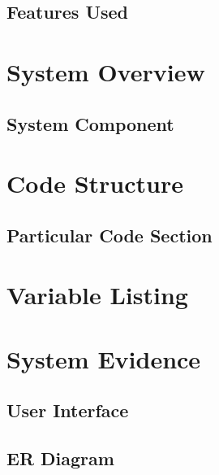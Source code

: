 \subsection{Features Used}

\section{System Overview}

\subsection{System Component}

\section{Code Structure}

\subsection{Particular Code Section}

\section{Variable Listing}

\section{System Evidence}

\subsection{User Interface}

\subsection{ER Diagram}

